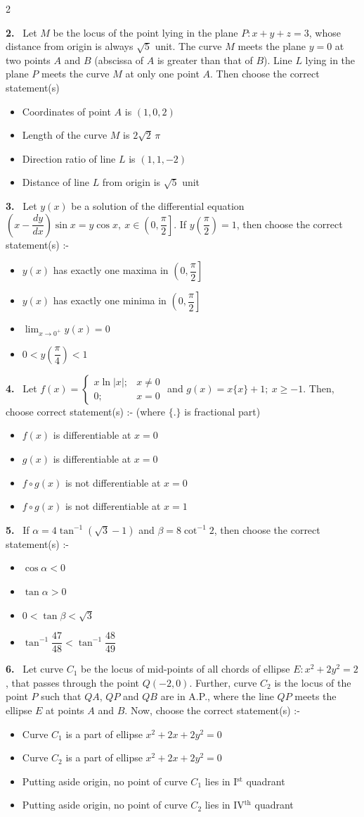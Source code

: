 \documentclass[10pt]{extarticle}
\newcommand{\qn}[1]{\par\smallskip\noindent\textbf{#1.}~}
\newenvironment{qoptions}{\begin{itemize}[leftmargin=1.8em,itemsep=1pt,topsep=2pt,label={}]}{\end{itemize}}
\newcommand{\opt}[2]{\item[(#1)] #2}
\begin{document}
\begin{multicols}{2}
\qn{2} Let $M$ be the locus of the point lying in the plane $P: x+y+z=3$, whose distance from origin is always $\sqrt5$ unit. The curve $M$ meets the plane $y=0$ at two points $A$ and $B$ (abscissa of $A$ is greater than that of $B$). Line $L$ lying in the plane $P$ meets the curve $M$ at only one point $A$. Then choose the correct statement(s)
\begin{qoptions}
\opt{A}{Coordinates of point $A$ is $(1,0,2)$}
\opt{B}{Length of the curve $M$ is $2\sqrt2\,\pi$}
\opt{C}{Direction ratio of line $L$ is $(1,1,-2)$}
\opt{D}{Distance of line $L$ from origin is $\sqrt5$ unit}
\end{qoptions}

\qn{3} Let $y(x)$ be a solution of the differential equation $\left(x-\dfrac{dy}{dx}\right)\sin x=y\cos x,\ x\in\left(0,\dfrac\pi2\right]$. If $y\!\left(\dfrac\pi2\right)=1$, then choose the correct statement(s) :-
\begin{qoptions}
\opt{A}{$y(x)$ has exactly one maxima in $\left(0,\dfrac\pi2\right]$}
\opt{B}{$y(x)$ has exactly one minima in $\left(0,\dfrac\pi2\right]$}
\opt{C}{$\displaystyle\lim_{x\to0^+}y(x)=0$}
\opt{D}{$0<y\!\left(\dfrac\pi4\right)<1$}
\end{qoptions}

\qn{4} Let $f(x)=\begin{cases}x\ln|x|; & x\ne0\\ 0; & x=0\end{cases}$ and $g(x)=x\{x\}+1;\ x\ge-1$. Then, choose correct statement(s) :- (where $\{.\}$ is fractional part)
\begin{qoptions}
\opt{A}{$f(x)$ is differentiable at $x=0$}
\opt{B}{$g(x)$ is differentiable at $x=0$}
\opt{C}{$f\circ g(x)$ is not differentiable at $x=0$}
\opt{D}{$f\circ g(x)$ is not differentiable at $x=1$}
\end{qoptions}

\qn{5} If $\alpha=4\tan^{-1}(\sqrt3-1)$ and $\beta=8\cot^{-1}2$, then choose the correct statement(s) :-
\begin{qoptions}
\opt{A}{$\cos\alpha<0$}
\opt{B}{$\tan\alpha>0$}
\opt{C}{$0<\tan\beta<\sqrt3$}
\opt{D}{$\tan^{-1}\dfrac{47}{48}<\tan^{-1}\dfrac{48}{49}$}
\end{qoptions}

\qn{6} Let curve $C_1$ be the locus of mid-points of all chords of ellipse $E: x^2+2y^2=2$, that passes through the point $Q(-2,0)$. Further, curve $C_2$ is the locus of the point $P$ such that $QA$, $QP$ and $QB$ are in A.P., where the line $QP$ meets the ellipse $E$ at points $A$ and $B$. Now, choose the correct statement(s) :-
\begin{qoptions}
\opt{A}{Curve $C_1$ is a part of ellipse $x^2+2x+2y^2=0$}
\opt{B}{Curve $C_2$ is a part of ellipse $x^2+2x+2y^2=0$}
\opt{C}{Putting aside origin, no point of curve $C_1$ lies in I$^{\text{st}}$ quadrant}
\opt{D}{Putting aside origin, no point of curve $C_2$ lies in IV$^{\text{th}}$ quadrant}
\end{qoptions}


\end{multicols}
\end{document}
